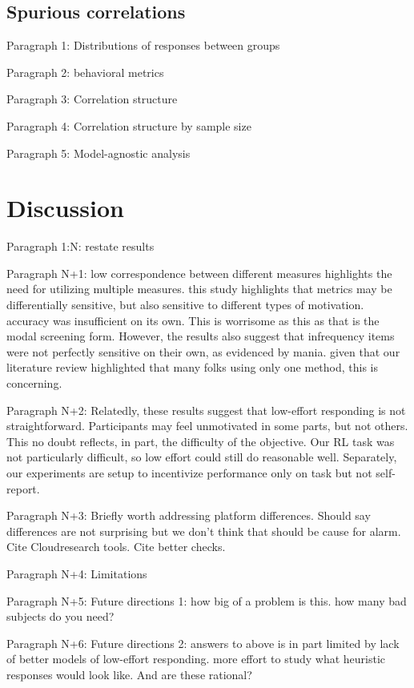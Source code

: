 \documentclass[a4paper,notitlepage,12pt]{article}
\begin{document}
\subsection{Spurious correlations}

Paragraph 1: Distributions of responses between groups

Paragraph 2: behavioral metrics

Paragraph 3: Correlation structure 

Paragraph 4: Correlation structure by sample size

Paragraph 5: Model-agnostic analysis 

\section{Discussion}

Paragraph 1:N: restate results

Paragraph N+1: low correspondence between different measures highlights the need for utilizing multiple measures. this study highlights that metrics may be differentially sensitive, but also sensitive to different types of motivation. accuracy was insufficient on its own. This is worrisome as this as that is the modal screening form. However, the results also suggest that infrequency items were not perfectly sensitive on their own, as evidenced by mania. given that our literature review highlighted that many folks using only one method, this is concerning. 

Paragraph N+2: Relatedly, these results suggest that low-effort responding is not straightforward. Participants may feel unmotivated in some parts, but not others. This no doubt reflects, in part, the difficulty of the objective. Our RL task was not particularly difficult, so low effort could still do reasonable well. Separately, our experiments are setup to incentivize performance only on task but not self-report. 

Paragraph N+3: Briefly worth addressing platform differences. Should say differences are not surprising but we don't think that should be cause for alarm. Cite Cloudresearch tools. Cite better checks. 

Paragraph N+4: Limitations

Paragraph N+5: Future directions 1: how big of a problem is this. how many bad subjects do you need?

Paragraph N+6: Future directions 2: answers to above is in part limited by lack of better models of low-effort responding. more effort to study what heuristic responses would look like. And are these rational? 
\end{document}
